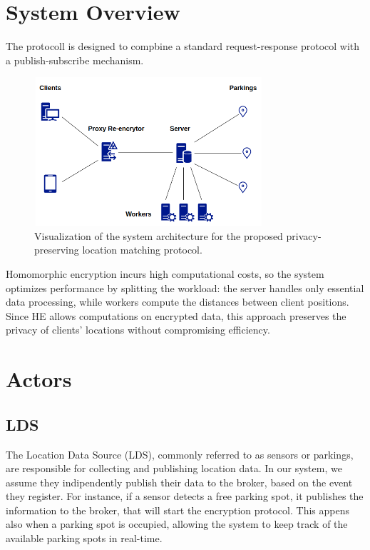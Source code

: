 \documentclass[12pt,a4paper,twoside]{book}
\begin{document}
\section{System Overview}
The protocoll is designed to compbine a standard request-response protocol with a publish-subscribe mechanism.


\begin{figure}[h]
    \centering
    \includegraphics[width=8.5cm,height=5.5cm]{img/architecture-scheme.png}
    \caption{Visualization of the system architecture for the proposed privacy-preserving location matching protocol.}
    \label{fig:architecture}
\end{figure}

Homomorphic encryption incurs high computational costs, so the system optimizes performance by splitting the workload: the server handles only essential data processing, while workers compute the distances between client positions. Since HE allows computations on encrypted data, this approach preserves the privacy of clients' locations without compromising efficiency.

\section{Actors}

\subsection{LDS}
The Location Data Source (LDS), commonly referred to as sensors or parkings, are responsible for collecting and publishing location data. In our system, we assume they indipendently publish their data to the broker, based on the event they register. For instance, if a sensor detects a free parking spot, it publishes the information to the broker, that will start the encryption protocol. This appens also when a parking spot is occupied, allowing the system to keep track of the available parking spots in real-time.
\end{document}
